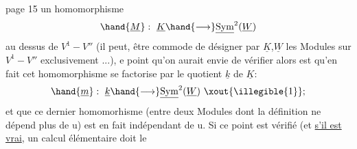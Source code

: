 page 15 un homomorphisme
\[ \hand{\underline{M}} : \ \underline{K}\hand{\longrightarrow}\underline{\mathrm{Sym}}^2(\underline{W}) \]
au dessus de $V^1-V''$ (il peut, être commode de désigner par $\underline{K}$,$\underline{W}$ les Modules
sur $V^1-V''$ exclusivement ...),  e point qu'on aurait envie de vérifier
alors est qu'en fait cet homomorphisme se factorise par le quotient $\underline{k}$ de $\underline{K}$:
\[ \hand{\underline{m}} : \ \underline{k}\hand{\longrightarrow}\underline{\mathrm{Sym}}^2(\underline{W}) \ \xout{\illegible{1}} ; \]
et que ce dernier homomorhisme (entre deux Modules dont la définition ne
 dépend plus de u) est en fait indépendant de
u. Si ce point est vérifié (et \uline{s'il est vrai}, un calcul élémentaire doit le

